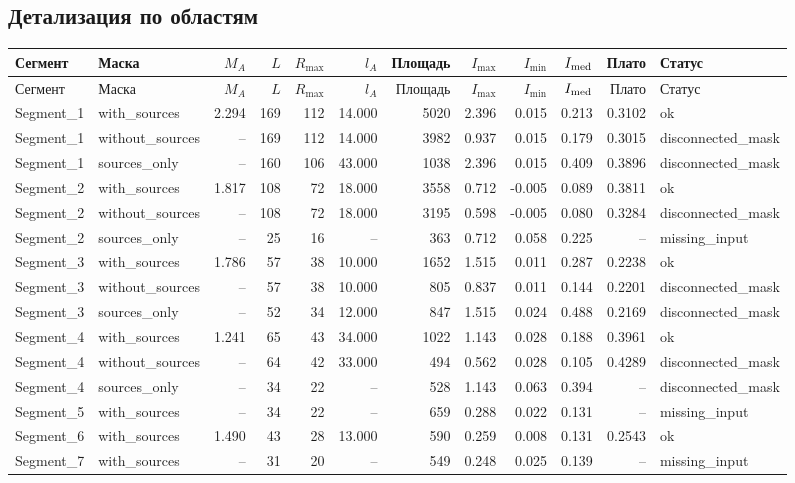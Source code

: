 \documentclass[10pt,a4paper]{article}
\begin{document}
\subsection*{Детализация по областям}
\scriptsize
\setlength{\tabcolsep}{2.7pt}
\begin{longtable}{llrrrrrrrrrl}
\toprule
Сегмент & Маска & $M_A$ & $L$ & $R_{\max}$ & $l_A$ & Площадь & $I_{\max}$ & $I_{\min}$ & $I_{\rm med}$ & Плато & Статус \\
\midrule\endfirsthead
\toprule
Сегмент & Маска & $M_A$ & $L$ & $R_{\max}$ & $l_A$ & Площадь & $I_{\max}$ & $I_{\min}$ & $I_{\rm med}$ & Плато & Статус \\
\midrule\endhead
Segment\_1 & with\_sources & 2.294 & 169 & 112 & 14.000 & 5020 & 2.396 & 0.015 & 0.213 & 0.3102 & ok \\
Segment\_1 & without\_sources & -- & 169 & 112 & 14.000 & 3982 & 0.937 & 0.015 & 0.179 & 0.3015 & disconnected\_mask \\
Segment\_1 & sources\_only & -- & 160 & 106 & 43.000 & 1038 & 2.396 & 0.015 & 0.409 & 0.3896 & disconnected\_mask \\
Segment\_2 & with\_sources & 1.817 & 108 & 72 & 18.000 & 3558 & 0.712 & -0.005 & 0.089 & 0.3811 & ok \\
Segment\_2 & without\_sources & -- & 108 & 72 & 18.000 & 3195 & 0.598 & -0.005 & 0.080 & 0.3284 & disconnected\_mask \\
Segment\_2 & sources\_only & -- & 25 & 16 & -- & 363 & 0.712 & 0.058 & 0.225 & -- & missing\_input \\
Segment\_3 & with\_sources & 1.786 & 57 & 38 & 10.000 & 1652 & 1.515 & 0.011 & 0.287 & 0.2238 & ok \\
Segment\_3 & without\_sources & -- & 57 & 38 & 10.000 & 805 & 0.837 & 0.011 & 0.144 & 0.2201 & disconnected\_mask \\
Segment\_3 & sources\_only & -- & 52 & 34 & 12.000 & 847 & 1.515 & 0.024 & 0.488 & 0.2169 & disconnected\_mask \\
Segment\_4 & with\_sources & 1.241 & 65 & 43 & 34.000 & 1022 & 1.143 & 0.028 & 0.188 & 0.3961 & ok \\
Segment\_4 & without\_sources & -- & 64 & 42 & 33.000 & 494 & 0.562 & 0.028 & 0.105 & 0.4289 & disconnected\_mask \\
Segment\_4 & sources\_only & -- & 34 & 22 & -- & 528 & 1.143 & 0.063 & 0.394 & -- & disconnected\_mask \\
Segment\_5 & with\_sources & -- & 34 & 22 & -- & 659 & 0.288 & 0.022 & 0.131 & -- & missing\_input \\
Segment\_6 & with\_sources & 1.490 & 43 & 28 & 13.000 & 590 & 0.259 & 0.008 & 0.131 & 0.2543 & ok \\
Segment\_7 & with\_sources & -- & 31 & 20 & -- & 549 & 0.248 & 0.025 & 0.139 & -- & missing\_input \\
\bottomrule
\end{longtable}
\normalsize
\clearpage
\end{document}
